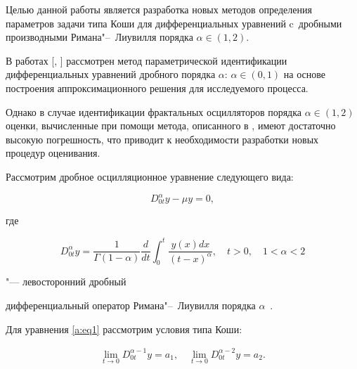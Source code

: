 Целью данной работы является разработка новых методов определения параметров задачи типа Коши для дифференциальных уравнений c~дробными производными Римана"--~Лиувилля порядка $\alpha \in

(1, 2)$. 

В работах [, ] рассмотрен метод параметрической иден\-ти\-фи\-ка\-ции дифференциальных уравнений дробного порядка $\alpha$: $\alpha \in (0, 1)$ на основе построения аппроксимационного решения для исследуемого процесса. 

Однако в случае иден\-ти\-фи\-ка\-ции фрактальных осцилляторов порядка $\alpha \in (1, 2)$ оценки, вычисленные при помощи метода, описанного в \cite{v:Av2011}, имеют достаточно высокую погрешность, что приводит к необходимости разработки новых процедур оценивания.



\smallskip




Рассмотрим дробное ос\-цил\-ля\-цион\-ное уравнение следующего вида:

\begin{equation}\label{a:eq1}

D_{0t}^{\alpha}y-\mu y=0,

\end{equation}

где

$$D_{0t}^{\alpha}y=\frac{1}{\Gamma(1-\alpha)}\frac{d}{dt}\int_{0}^{t}\frac{y (x) dx}{\left(t-x\right)^{\alpha}},\quad 

t>0,\quad  1<{\alpha}<2 $$ 

"--- левосторонний дробный

диф\-фе\-рен\-циаль\-ный оператор Римана"--~Лиувилля порядка $\alpha$~\cite{v:K_S_T}. 

Для уравнения \eqref{a:eq1} рассмотрим условия	 типа Коши:

\begin{equation}\label{a:eq2}

\begin{array}{cc}

\lim \limits_{t \rightarrow 0}{D_{0t}^{\alpha-1}y}=a_1, \quad 

\lim \limits_{t \rightarrow 0}{D_{0t}^{\alpha-2}y}=a_2.

\end{array}

\end{equation}




